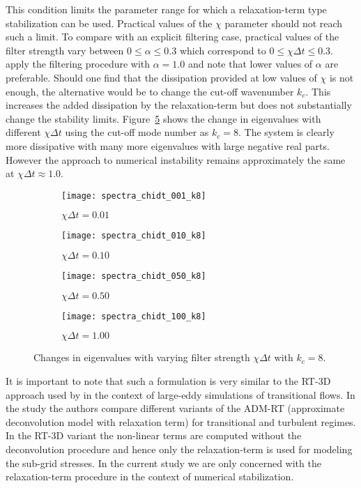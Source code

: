 This condition limits the parameter range for which a relaxation-term type stabilization can be used. Practical values of the $\chi$ parameter should not reach such a limit. To compare with an explicit filtering case, practical values of the filter strength vary between $0\le\alpha\le0.3$ which correspond to $0\le\chi\Delta t\le0.3$. \cite{fischer01} apply the filtering procedure with $\alpha=1.0$ and note that lower values of $\alpha$ are preferable. Should one find that the dissipation provided at low values of $\chi$ is not enough, the alternative would be to change the cut-off wavenumber $k_{c}$. This increases the added dissipation by the relaxation-term but does not substantially change the stability limits. Figure~\ref{fig:rt_stability_k8} shows the change in eigenvalues with different $\chi\Delta t$ using the cut-off mode number as $k_{c}=8$. The system is clearly more dissipative with many more eigenvalues with large negative real parts. However the approach to numerical instability remains approximately the same at $\chi\Delta t\approx 1.0$.
\begin{figure}[h]
	\centering
	\begin{subfigure}[b]{0.45\textwidth}
		\centering
		\texttt{[image: spectra\_chidt\_001\_k8]}
		\caption{$\chi\Delta t=0.01$}
		\label{fig:spectra_chidt001_k8}
	\end{subfigure}
	\begin{subfigure}[b]{0.45\textwidth}
		\centering
		\texttt{[image: spectra\_chidt\_010\_k8]}
		\caption{$\chi\Delta t=0.10$}
		\label{fig:spectra_chidt01_k8}
	\end{subfigure}
	\begin{subfigure}[b]{0.45\textwidth}
		\centering
		\texttt{[image: spectra\_chidt\_050\_k8]}
		\caption{$\chi\Delta t=0.50$}
		\label{fig:spectra_chidt050_k8}
	\end{subfigure}
	\begin{subfigure}[b]{0.45\textwidth}
		\centering
		\texttt{[image: spectra\_chidt\_100\_k8]}
		\caption{$\chi\Delta t=1.00$}
		\label{fig:spectra_chidt100_k8}
	\end{subfigure}	
	\caption{Changes in eigenvalues with varying filter strength $\chi\Delta t$ with $k_{c}=8$.}
	\label{fig:rt_stability_k8}
\end{figure}

It is important to note that such a formulation is very similar to the RT-3D approach used by \cite{schlatter04} in the context of large-eddy simulations of transitional flows. In the study the authors compare different variants of the ADM-RT (approximate deconvolution model with relaxation term) for transitional and turbulent regimes. In the RT-3D variant the non-linear terms are computed without the deconvolution procedure and hence only the relaxation-term is used for modeling the sub-grid stresses. In the current study we are only concerned with the relaxation-term procedure in the context of numerical stabilization. 

